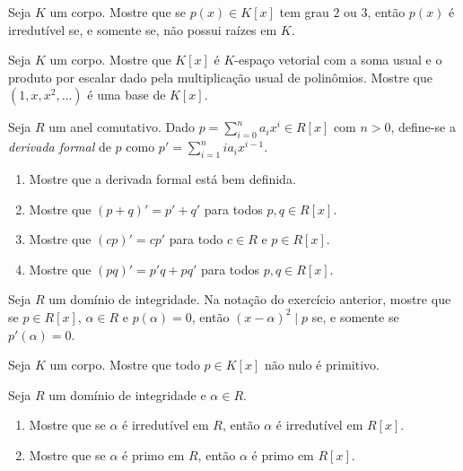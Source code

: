 \begin{exer}
    Seja $K$ um corpo. Mostre que se $p(x)\in K[x]$ tem grau $2$ ou $3$, então $p(x)$ é irredutível se, e somente se, não possui raízes em $K$.
\end{exer}

\begin{exer}
    Seja $K$ um corpo. Mostre que $K[x]$ é $K$-espaço vetorial com a soma usual e o produto por escalar dado pela multiplicação usual de polinômios. Mostre que $(1, x, x^2, \dots)$ é uma base de $K[x]$.
\end{exer}

\begin{exer}
    Seja $R$ um anel comutativo. Dado $p=\sum_{i=0}^n a_ix^i\in R[x]$ com $n>0$, define-se a \emph{derivada formal} de $p$ como $p'=\sum_{i=1}^{n} ia_i x^{i-1}$.
    \begin{enumerate}
        \item Mostre que a derivada formal está bem definida.
        \item Mostre que $(p+q)'=p'+q'$ para todos $p, q \in R[x]$.
        \item Mostre que $(cp)'=cp'$ para todo $c \in R$ e $p \in R[x]$.
        \item Mostre que $(pq)'=p'q+pq'$ para todos $p, q \in R[x]$.
    \end{enumerate}
\end{exer}

\begin{exer}
    Seja $R$ um domínio de integridade. Na notação do exercício anterior, mostre que se $p \in R[x]$, $\alpha \in R$ e $p(\alpha)=0$, então $(x-\alpha)^2\mid p$ se, e somente se $p'(\alpha)=0$.
\end{exer}

\begin{exer}
    Seja $K$ um corpo. Mostre que todo $p \in K[x]$ não nulo é primitivo.
\end{exer}

\begin{exer}\label{exer:irredutivelPrimo}
    Seja $R$ um domínio de integridade e $\alpha \in R$.
    \begin{enumerate}
        \item Mostre que se $\alpha$ é irredutível em $R$, então $\alpha$ é irredutível em $R[x]$.
        \item Mostre que se $\alpha$ é primo em $R$, então $\alpha$ é primo em $R[x]$.
    \end{enumerate}
\end{exer}
